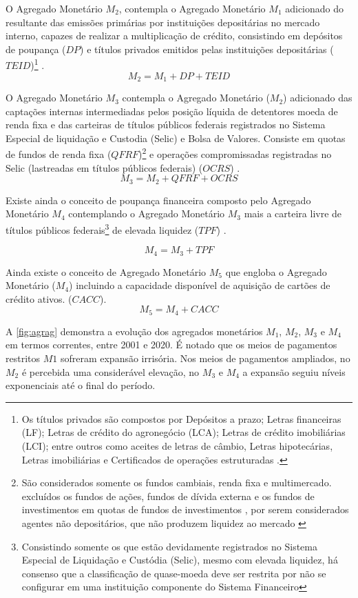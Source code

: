 \documentclass[12pt,12pt,openright,oneside,a4paper,chapter=TITLE,section=TITLE,subsection=TITLE,subsubsection=TITLE,english,french,spanish,portugues,sumario=tradicional]{abntex2}
\begin{document}
O Agregado Monetário \(M_2\), contempla o Agregado Monetário \(M_1\) adicionado do resultante das emissões primárias por instituições depositárias no mercado interno, capazes de realizar a multiplicação de crédito, consistindo em depósitos de poupança (\(DP\)) e títulos privados emitidos pelas instituições depositárias (\(TEID\))\footnote{Os títulos privados são compostos por Depósitos a prazo; Letras financeiras (LF); Letras de crédito do agronegócio (LCA); Letras de crédito imobiliárias (LCI); entre outros como aceites de letras de câmbio, Letras hipotecárias, Letras imobiliárias e Certificados de operações estruturadas \cite{sgs:mpa}.} \cite{sgs:mpa}.
\[
M_2 = M_1 + DP + TEID
\]

O Agregado Monetário \(M_3\) contempla o Agregado Monetário (\(M_2\)) adicionado das captações internas intermediadas pelos posição líquida de detentores moeda de renda fixa e das carteiras de títulos públicos federais registrados no Sistema Especial de liquidação e Custodia (Selic) e Bolsa de Valores. Consiste em quotas de fundos de renda fixa (\(QFRF\))\footnote{São considerados somente os fundos cambiais, renda fixa  e multimercado. excluídos os fundos de ações, fundos de dívida externa e os fundos de investimentos em quotas de fundos de investimentos , por serem considerados agentes não depositários, que não produzem liquidez ao mercado \cite{sgs:mpa}} e operações compromissadas registradas no Selic (lastreadas em títulos públicos federais) (\(OCRS\)) \cite{bcb:2019} \cite{sgs:mpa}.
\[
M_3 = M_2 + QFRF + OCRS
\]

Existe ainda o conceito de poupança financeira composto pelo Agregado Monetário \(M_4\) contemplando o Agregado Monetário \(M_3\) mais a carteira livre de títulos públicos federais\footnote{Consistindo somente os que estão devidamente registrados no Sistema Especial de Liquidação e Custódia (Selic), mesmo com elevada liquidez, há consenso que a classificação de quase-moeda deve ser restrita por não se configurar em uma instituição componente do Sistema Financeiro} de elevada liquidez (\(TPF\)) \cite{bcb:2019}.

\[
M_4 = M_3 + TPF
\]

Ainda existe o conceito de Agregado Monetário \(M_5\) que engloba o Agregado Monetário (\(M_4\)) incluindo a capacidade disponível de aquisição de cartões de crédito ativos. (\(CACC\)).
\[
M_5 = M_4 + CACC
\]

A \autoref{fig:agrag} demonstra a evolução dos agregados monetários \(M_1\), \(M_2\), \(M_3\) e \(M_4\) em termos correntes, entre 2001 e 2020. É notado que os meios de pagamentos restritos \(M1\) sofreram expansão irrisória. Nos meios de pagamentos ampliados, no \(M_2\) é percebida uma considerável elevação, no \(M_3\) e \(M_4\) a expansão seguiu níveis exponenciais até o final do período.
\end{document}
